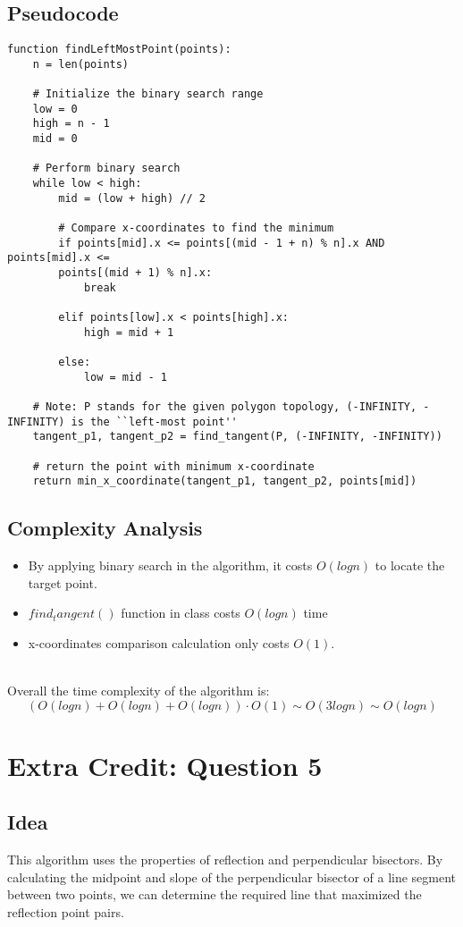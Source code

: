 \documentclass{article}
\begin{document}
\subsection*{Pseudocode}
\begin{verbatim}
function findLeftMostPoint(points):
    n = len(points)

    # Initialize the binary search range
    low = 0
    high = n - 1
    mid = 0

    # Perform binary search
    while low < high:
        mid = (low + high) // 2

        # Compare x-coordinates to find the minimum
        if points[mid].x <= points[(mid - 1 + n) % n].x AND points[mid].x <=
        points[(mid + 1) % n].x:
            break

        elif points[low].x < points[high].x:
            high = mid + 1

        else:
            low = mid - 1

    # Note: P stands for the given polygon topology, (-INFINITY, -INFINITY) is the ``left-most point''
    tangent_p1, tangent_p2 = find_tangent(P, (-INFINITY, -INFINITY))

    # return the point with minimum x-coordinate
    return min_x_coordinate(tangent_p1, tangent_p2, points[mid])
\end{verbatim}

\subsection*{Complexity Analysis}
\begin{itemize}
    \item By applying binary search in the algorithm, it costs $O(logn)$ to locate the target point.
    \item $find_tangent()$ function in class costs $O(logn)$ time
    \item x-coordinates comparison calculation only costs $O(1)$.
\end{itemize}
\\
Overall the time complexity of the algorithm is:
\[ ( O(logn) + O(logn) + O(logn) ) \cdot O(1) \sim O(3logn) \sim O(logn) \]

\section*{Extra Credit: Question 5}

\subsection*{Idea}
This algorithm uses the properties of reflection and perpendicular bisectors. By calculating the midpoint and slope of the perpendicular bisector of a line segment between two points, we can determine the required line that maximized the reflection point pairs.
\end{document}
